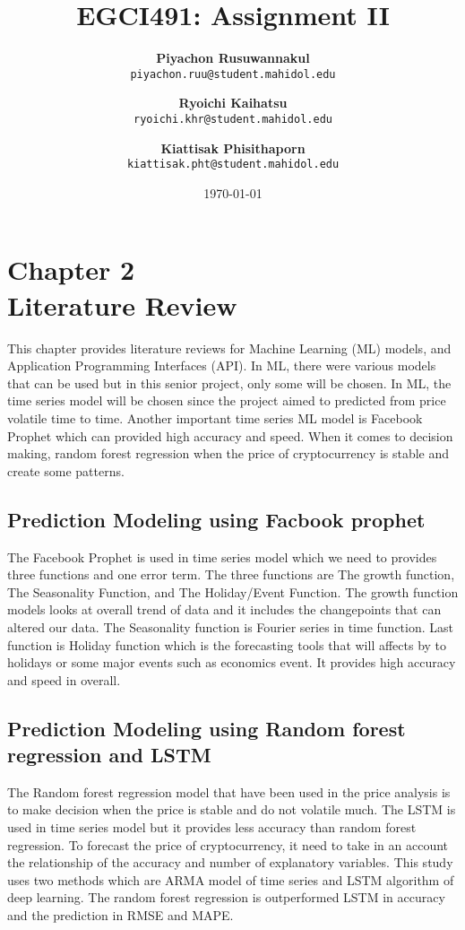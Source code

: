 \documentclass[a4paper, 12pt]{report}
\title{EGCI491: Assignment II}
\author{
	\textbf{Piyachon Rusuwannakul} \\
	\texttt{piyachon.ruu@student.mahidol.edu}
	\and
	\textbf{Ryoichi Kaihatsu} \\
	\texttt{ryoichi.khr@student.mahidol.edu}
	\and
	\textbf{Kiattisak Phisithaporn} \\
	\texttt{kiattisak.pht@student.mahidol.edu}
} %
\date{\today}
\begin{document}
	
	\maketitle
		
	\chapter*{\centering Chapter 2 \\  Literature Review}
	
	\hspace{\parindent} 
	
	This chapter provides literature reviews for Machine Learning (ML) models, and Application Programming Interfaces (API). In ML, there were various models that can be used but in this senior project, only some will be chosen. In ML, the time series model will be chosen since the project aimed to predicted from price volatile time to time. Another important time series ML model is Facebook Prophet which can provided high accuracy and speed. When it comes to decision making, random forest regression when the price of cryptocurrency is stable and create some patterns. 

	\setcounter{chapter}{2}

	
	\section{Prediction Modeling using Facbook prophet \cite{9776665}}
	The Facebook Prophet is used in time series model which we need to provides three functions and one error term. The three functions are The growth function, The Seasonality Function, and The Holiday/Event Function. The growth function models looks at overall trend of data and it includes the changepoints that can altered our data. The Seasonality function is Fourier series in time function. Last function is Holiday function which is the forecasting tools that will affects by to holidays or some major events such as economics event. It provides high accuracy and speed in overall.
	\section{Prediction Modeling using Random forest  regression and LSTM\cite{jrfm16010051}}
	The Random forest regression model that have been used in the price analysis is to make decision when the price is stable and do not volatile much. The LSTM is used in time series model but it provides less accuracy than random forest regression. To forecast the price of cryptocurrency, it need to take in an account the relationship of the accuracy and number of explanatory variables. This study uses two methods which are ARMA model of time series and LSTM algorithm of deep learning. The random forest regression is outperformed LSTM in accuracy and the prediction in RMSE and MAPE. 
	\medskip
	
	
	
\end{document}
